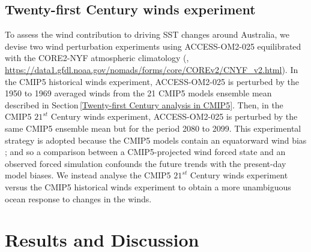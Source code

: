 \documentclass[draft,linenumbers]{agujournal2018}
\begin{document}
\subsection{Twenty-first Century winds experiment} \label{Twenty-first Century winds experiment}
To assess the wind contribution to driving SST changes around Australia, we devise two wind perturbation experiments using ACCESS-OM2-025 equilibrated with the CORE2-NYF atmospheric climatology (\citealp{Large2009},  \url{https://data1.gfdl.noaa.gov/nomads/forms/core/COREv2/CNYF_v2.html}). In the CMIP5 historical winds experiment, ACCESS-OM2-025 is perturbed by the 1950 to 1969 averaged winds from the 21 CMIP5 models ensemble mean described in Section\,\ref{Twenty-first Century analysis in CMIP5}. Then, in the CMIP5 $21^{st}$ Century winds experiment, ACCESS-OM2-025 is perturbed by the same CMIP5 ensemble mean but for the period 2080 to 2099. This experimental strategy is adopted because the CMIP5 models contain an equatorward wind bias \citep{Bracegirdle2013}; and so a comparison between a CMIP5-projected wind forced state and an observed forced simulation confounds the future trends with the present-day model biases. We instead analyse the CMIP5 $21^{st}$ Century winds experiment versus the CMIP5 historical winds experiment to obtain a more unambiguous ocean response to changes in the winds.

\section{Results and Discussion}
\end{document}
